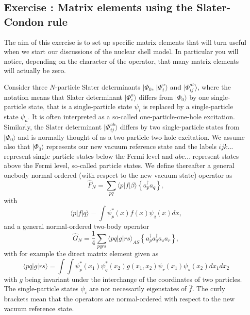 \documentclass[graybox,sectrefs,envcountresetchap,open=right]{svmonodo}
\newenvironment{doconceexercise}{}{}
\newcounter{doconceexercisecounter}
\begin{document}
\begin{doconceexercise}

\subsection*{Exercise \thedoconceexercisecounter: Matrix elements using the Slater-Condon rule}


The aim of this exercise is to set up specific matrix elements that will turn useful when we start our discussions of the nuclear shell model. In particular you will notice, depending on the character of the operator, that many matrix elements will actually be zero.

Consider three $N$-particle  Slater determinants  $|\Phi_0$, $|\Phi_i^a\rangle$ and $|\Phi_{ij}^{ab}\rangle$, where the notation means that 
Slater determinant $|\Phi_i^a\rangle$ differs from $|\Phi_0\rangle$ by one single-particle state, that is a single-particle
state $\psi_i$ is replaced by a single-particle state $\psi_a$. 
It is often interpreted as a so-called one-particle-one-hole excitation.
Similarly, the Slater determinant $|\Phi_{ij}^{ab}\rangle$
differs by two single-particle states from $|\Phi_0\rangle$ and is normally thought of as a two-particle-two-hole excitation.
We assume also that $|\Phi_0\rangle$ represents our new vacuum reference state
and the labels $ijk\dots$ represent single-particle states below the Fermi level and $abc\dots$ represent states above the Fermi level, so-called particle states.
We define thereafter a general onebody normal-ordered (with respect to the new vacuum state) operator 
as
\[
\hat{F}_N=\sum_{pq}\langle p |f |\beta\rangle \left\{a_{p}^{\dagger}a_{q}\right\}  ,
\]
with
\[
\langle p |f| q\rangle=\int \psi_{p}^{*}(x)f(x)\psi_{q}(x)dx ,
\]
and a general normal-ordered two-body operator
\[
\hat{G}_N = \frac{1}{4}\sum_{pqrs}
\langle pq |g| rs\rangle_{AS} \left\{a_{p}^{\dagger}a_{q}^{\dagger}a_{s}a_{r}\right\} ,
\]
with for example the direct matrix element given as
\[
\langle pq |g| rs\rangle=
\int\int \psi_{p}^{*}(x_{1})\psi_{q}^{*}(x_{2})g(x_{1}, x_{2})\psi_{r}(x_{1})\psi_{s}(x_{2})dx_{1}dx_{2}
\]
with $g$ being invariant under the interchange of the coordinates of two particles.
The single-particle states $\psi_i$ are not necessarily eigenstates of $\hat{f}$.  The curly brackets mean that the operators are normal-ordered with respect to the new vacuum reference state. 


\end{doconceexercise}
\end{document}
